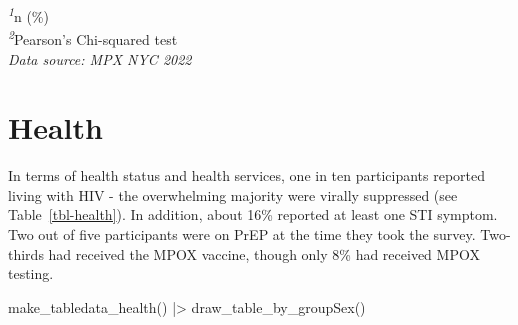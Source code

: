 \documentclass[
  letterpaper,
  DIV=11,
  numbers=noendperiod,
  oneside]{scrreprt}
\newenvironment{Shaded}{\begin{snugshade}}{\end{snugshade}}
\newcommand{\FunctionTok}[1]{\textcolor[rgb]{0.28,0.35,0.67}{#1}}
\newcommand{\NormalTok}[1]{\textcolor[rgb]{0.00,0.23,0.31}{#1}}
\newcommand{\SpecialCharTok}[1]{\textcolor[rgb]{0.37,0.37,0.37}{#1}}
\begin{document}
\begin{minipage}{\linewidth}
\textsuperscript{\textit{1}}n (\%)\\
\textsuperscript{\textit{2}}Pearson's Chi-squared test\\
\emph{Data source: MPX NYC 2022}\\
\end{minipage}

\hypertarget{health}{%
\section{Health}\label{health}}

In terms of health status and health services, one in ten participants
reported living with HIV - the overwhelming majority were virally
suppressed (see Table~\ref{tbl-health}). In addition, about 16\%
reported at least one STI symptom. Two out of five participants were on
PrEP at the time they took the survey. Two-thirds had received the MPOX
vaccine, though only 8\% had received MPOX testing.

\begin{Shaded}
\begin{Highlighting}[]
\FunctionTok{make\_tabledata\_health}\NormalTok{() }\SpecialCharTok{|\textgreater{}}
  \FunctionTok{draw\_table\_by\_groupSex}\NormalTok{()}
\end{Highlighting}
\end{Shaded}
\end{document}
